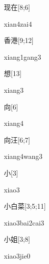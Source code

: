 \begin{verbete}{现在}[8;6]
\begin{pronuncia}{xian4zai4}
\end{pronuncia}
\end{verbete}

\begin{verbete}{香港}[9;12]
\begin{pronuncia}{xiang1gang3}
\end{pronuncia}
\end{verbete}

\begin{verbete}[xiang3]{想}[13]
\begin{pronuncia}{xiang3}
\end{pronuncia}
\end{verbete}

\begin{verbete}[xiang4]{向}[6]
\begin{pronuncia}{xiang4}
\end{pronuncia}
\end{verbete}

\begin{verbete}{向汪}[6;7]
\begin{pronuncia}{xiang4wang3}
\end{pronuncia}
\end{verbete}

\begin{verbete}[xiao3]{小}[3]
\begin{pronuncia}{xiao3}
\end{pronuncia}
\end{verbete}

\begin{verbete}{小白菜}[3;5;11]
\begin{pronuncia}{xiao3bai2cai3}
\end{pronuncia}
\end{verbete}

\begin{verbete}{小姐}[3;8]
\begin{pronuncia}{xiao3jie0}
\end{pronuncia}
\end{verbete}

